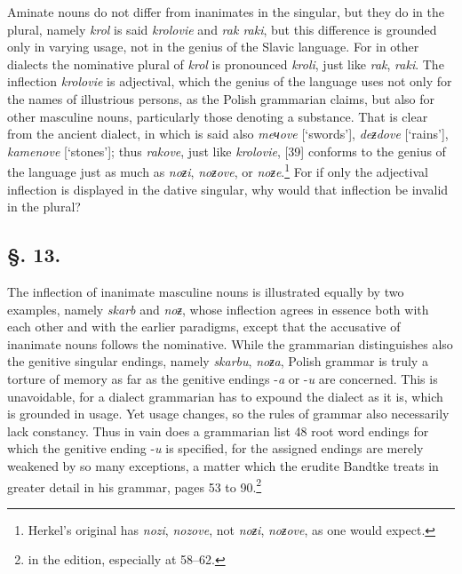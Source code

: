 Aminate nouns do not differ from inanimates in the singular, but they do in the plural, namely \textit{krol} is said \textit{krolovie} and \textit{rak raki}, but this difference is grounded only in varying usage, not in the genius of the Slavic language. For in other dialects the nominative plural of \textit{krol} is pronounced \textit{kroli}, just like \textit{rak}, \textit{raki}. The inflection \textit{krolovie} is adjectival, which the genius of the language uses not only for the names of illustrious persons, as the Polish grammarian claims, but also for other masculine nouns, particularly those denoting a substance. That is clear from the ancient dialect, in which is said also \textit{meчove} [‘swords’], \textit{deƶdove} [‘rains’], \textit{kamenove} [‘stones’]; thus \textit{rakove}, just like \textit{krolovie}, [39] conforms to the genius of the language just as much as \textit{noƶi}, \textit{noƶove}, or \textit{noƶe}.\footnote{Herkel’s original has \textit{nozi}, \textit{nozove}, not \textit{noƶi}, \textit{noƶove}, as one would expect.} For if only the adjectival inflection is displayed in the dative singular, why would that inflection be invalid in the plural?

\subsection*{\hspace*{\fill}§. 13.\hspace*{\fill}}

The inflection of inanimate masculine nouns is illustrated equally by two examples, namely \textit{skarb} and \textit{noƶ}, whose inflection agrees in essence both with each other and with the earlier paradigms, except that the accusative of inanimate nouns follows the nominative. While the grammarian distinguishes also the genitive singular endings, namely \textit{skarbu}, \textit{noƶa}, Polish grammar is truly a torture of memory as far as the genitive endings -\textit{a} or -\textit{u} are concerned. This is unavoidable, for a dialect grammarian has to expound the dialect as it is, which is grounded in usage. Yet usage changes, so the rules of grammar also necessarily lack constancy. Thus in vain does a grammarian list 48 root word endings for which the genitive ending -\textit{u} is specified, for the assigned endings are merely weakened by so many exceptions, a matter which the erudite Bandtke treats in greater detail in his grammar, pages 53 to 90.{\enlargethispage{0.5mm}\footnote{\citeauthor{bandtkie_polnische_1824} in the \citeyear{bandtkie_polnische_1824} edition, especially at 58--62.}}

